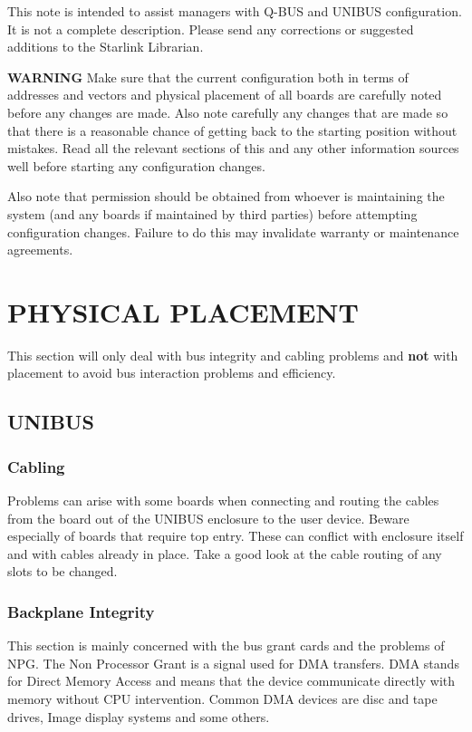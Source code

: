 This note is intended to assist managers with Q-BUS and UNIBUS  configuration.
It is not a complete description.
Please send any corrections or suggested additions to the Starlink Librarian.

{\bf WARNING} Make sure that the current  configuration
both in terms of addresses and vectors and physical placement
 of all boards are carefully noted before any changes are made.
Also note carefully any changes that are made so that there is a reasonable
chance of getting back to the starting position without mistakes.
 Read all the relevant sections of this and any other information
 sources well before starting any configuration changes.

Also note that permission should be obtained from whoever is maintaining
the system (and any boards if maintained by third parties) before attempting
configuration changes.
Failure to do this may invalidate warranty or maintenance agreements.


\section{PHYSICAL PLACEMENT}
This section will only deal with bus integrity and cabling
 problems and {\bf not} with placement to avoid bus interaction problems and
 efficiency.


\subsection{UNIBUS}
\subsubsection{Cabling}
Problems can arise with some boards when connecting and routing the
 cables from the board out of the UNIBUS enclosure to the user device.
 Beware especially of boards that require top entry.
These can conflict with  enclosure itself and with cables already in place.
Take a good look at the cable routing of any slots to be changed.

\subsubsection{Backplane Integrity}
This section is mainly concerned with the bus grant cards and the
 problems of NPG.
The Non Processor Grant is a signal used for DMA transfers.
DMA stands for Direct Memory Access and means that the device communicate
directly with memory without CPU intervention.
Common DMA devices are disc and tape drives, Image display systems and some
others.

